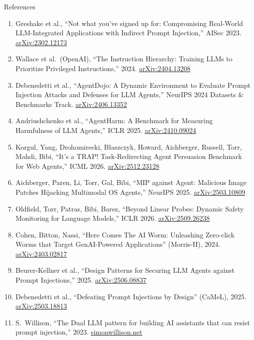 \begin{frame}[allowframebreaks]{References}
  \footnotesize
  \begin{enumerate}
    \item Greshake et al., ``Not what you've signed up for: Compromising Real-World LLM-Integrated Applications with Indirect Prompt Injection,'' AISec 2023. \href{https://arxiv.org/abs/2302.12173}{arXiv:2302.12173}
    \item Wallace et al.\ (OpenAI), ``The Instruction Hierarchy: Training LLMs to Prioritize Privileged Instructions,'' 2024. \href{https://arxiv.org/abs/2404.13208}{arXiv:2404.13208}
    \item Debenedetti et al., ``AgentDojo: A Dynamic Environment to Evaluate Prompt Injection Attacks and Defenses for LLM Agents,'' NeurIPS 2024 Datasets \& Benchmarks Track. \href{https://arxiv.org/abs/2406.13352}{arXiv:2406.13352}
    \item Andriushchenko et al., ``AgentHarm: A Benchmark for Measuring Harmfulness of LLM Agents,'' ICLR 2025. \href{https://arxiv.org/abs/2410.09024}{arXiv:2410.09024}
    \item Korgul, Yang, Drohomirecki, B\l{}aszczyk, Howard, Aichberger, Russell, Torr, Mahdi, Bibi, ``It's a TRAP! Task-Redirecting Agent Persuasion Benchmark for Web Agents,'' ICML 2026. \href{https://arxiv.org/abs/2512.23128}{arXiv:2512.23128}
    \item Aichberger, Paren, Li, Torr, Gal, Bibi, ``MIP against Agent: Malicious Image Patches Hijacking Multimodal OS Agents,'' NeurIPS 2025. \href{https://arxiv.org/abs/2503.10809}{arXiv:2503.10809}
    \item Oldfield, Torr, Patras, Bibi, Barez, ``Beyond Linear Probes: Dynamic Safety Monitoring for Language Models,'' ICLR 2026. \href{https://arxiv.org/abs/2509.26238}{arXiv:2509.26238}
    \item Cohen, Bitton, Nassi, ``Here Comes The AI Worm: Unleashing Zero-click Worms that Target GenAI-Powered Applications'' (Morris-II), 2024. \href{https://arxiv.org/abs/2403.02817}{arXiv:2403.02817}
    \item Beurer-Kellner et al., ``Design Patterns for Securing LLM Agents against Prompt Injections,'' 2025. \href{https://arxiv.org/abs/2506.08837}{arXiv:2506.08837}
    \item Debenedetti et al., ``Defeating Prompt Injections by Design'' (CaMeL), 2025. \href{https://arxiv.org/abs/2503.18813}{arXiv:2503.18813}
    \item S.\ Willison, ``The Dual LLM pattern for building AI assistants that can resist prompt injection,'' 2023. \href{https://simonwillison.net/2023/Apr/25/dual-llm-pattern/}{simonwillison.net}

\end{enumerate}
\end{frame}
